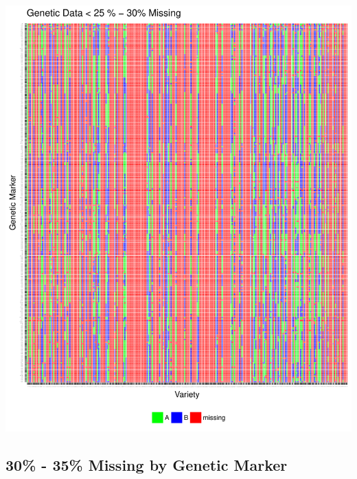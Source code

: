 \documentclass[11pt]{article}\usepackage[]{graphicx}\usepackage[]{color}
\makeatletter
\def\maxwidth{ %
  \ifdim\Gin@nat@width>\linewidth
    \linewidth
  \else
    \Gin@nat@width
  \fi
}
\newenvironment{knitrout}{}{} %
\makeatother
\begin{document}
\begin{knitrout}\footnotesize
{}\color{fgcolor}

{\centering \includegraphics[width=\maxwidth]{figure/missing_plot30-1} 

}



\end{knitrout}
\pagebreak
\subsection{30\% - 35\% Missing by Genetic Marker}
\end{document}
